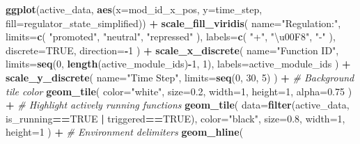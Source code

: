 \documentclass[
]{book}
\newenvironment{Shaded}{\begin{snugshade}}{\end{snugshade}}
\newcommand{\CommentTok}[1]{\textcolor[rgb]{0.56,0.35,0.01}{\textit{#1}}}
\newcommand{\DataTypeTok}[1]{\textcolor[rgb]{0.13,0.29,0.53}{#1}}
\newcommand{\DecValTok}[1]{\textcolor[rgb]{0.00,0.00,0.81}{#1}}
\newcommand{\FloatTok}[1]{\textcolor[rgb]{0.00,0.00,0.81}{#1}}
\newcommand{\KeywordTok}[1]{\textcolor[rgb]{0.13,0.29,0.53}{\textbf{#1}}}
\newcommand{\NormalTok}[1]{#1}
\newcommand{\OperatorTok}[1]{\textcolor[rgb]{0.81,0.36,0.00}{\textbf{#1}}}
\newcommand{\OtherTok}[1]{\textcolor[rgb]{0.56,0.35,0.01}{#1}}
\newcommand{\StringTok}[1]{\textcolor[rgb]{0.31,0.60,0.02}{#1}}
\begin{document}
\begin{Shaded}
\begin{Highlighting}[]
\KeywordTok{ggplot}\NormalTok{(active\_data, }\KeywordTok{aes}\NormalTok{(}\DataTypeTok{x=}\NormalTok{mod\_id\_x\_pos, }\DataTypeTok{y=}\NormalTok{time\_step, }\DataTypeTok{fill=}\NormalTok{regulator\_state\_simplified)) }\OperatorTok{+}
\StringTok{  }\KeywordTok{scale\_fill\_viridis}\NormalTok{(}
    \DataTypeTok{name=}\StringTok{"Regulation:"}\NormalTok{,}
    \DataTypeTok{limits=}\KeywordTok{c}\NormalTok{(}
      \StringTok{"promoted"}\NormalTok{,}
      \StringTok{"neutral"}\NormalTok{,}
      \StringTok{"repressed"}
\NormalTok{    ),}
    \DataTypeTok{labels=}\KeywordTok{c}\NormalTok{(}
      \StringTok{"+"}\NormalTok{,}
      \StringTok{"\textbackslash{}u00F8"}\NormalTok{,}
      \StringTok{"{-}"}
\NormalTok{    ),}
    \DataTypeTok{discrete=}\OtherTok{TRUE}\NormalTok{,}
    \DataTypeTok{direction=}\OperatorTok{{-}}\DecValTok{1}
\NormalTok{  ) }\OperatorTok{+}
\StringTok{  }\KeywordTok{scale\_x\_discrete}\NormalTok{(}
    \DataTypeTok{name=}\StringTok{"Function ID"}\NormalTok{,}
    \DataTypeTok{limits=}\KeywordTok{seq}\NormalTok{(}\DecValTok{0}\NormalTok{, }\KeywordTok{length}\NormalTok{(active\_module\_ids)}\OperatorTok{{-}}\DecValTok{1}\NormalTok{, }\DecValTok{1}\NormalTok{),}
    \DataTypeTok{labels=}\NormalTok{active\_module\_ids}
\NormalTok{  ) }\OperatorTok{+}
\StringTok{  }\KeywordTok{scale\_y\_discrete}\NormalTok{(}
    \DataTypeTok{name=}\StringTok{"Time Step"}\NormalTok{,}
    \DataTypeTok{limits=}\KeywordTok{seq}\NormalTok{(}\DecValTok{0}\NormalTok{, }\DecValTok{30}\NormalTok{, }\DecValTok{5}\NormalTok{)}
\NormalTok{  ) }\OperatorTok{+}
\StringTok{  }\CommentTok{\# Background tile color}
\StringTok{  }\KeywordTok{geom\_tile}\NormalTok{(}
    \DataTypeTok{color=}\StringTok{"white"}\NormalTok{,}
    \DataTypeTok{size=}\FloatTok{0.2}\NormalTok{,}
    \DataTypeTok{width=}\DecValTok{1}\NormalTok{,}
    \DataTypeTok{height=}\DecValTok{1}\NormalTok{,}
    \DataTypeTok{alpha=}\FloatTok{0.75}
\NormalTok{  ) }\OperatorTok{+}
\StringTok{  }\CommentTok{\# Highlight actively running functions}
\StringTok{  }\KeywordTok{geom\_tile}\NormalTok{(}
    \DataTypeTok{data=}\KeywordTok{filter}\NormalTok{(active\_data, is\_running}\OperatorTok{==}\OtherTok{TRUE} \OperatorTok{|}\StringTok{ }\NormalTok{triggered}\OperatorTok{==}\OtherTok{TRUE}\NormalTok{),}
    \DataTypeTok{color=}\StringTok{"black"}\NormalTok{,}
    \DataTypeTok{size=}\FloatTok{0.8}\NormalTok{,}
    \DataTypeTok{width=}\DecValTok{1}\NormalTok{,}
    \DataTypeTok{height=}\DecValTok{1}
\NormalTok{  ) }\OperatorTok{+}
\StringTok{  }\CommentTok{\# Environment delimiters}
\StringTok{  }\KeywordTok{geom\_hline}\NormalTok{(}

\end{Highlighting}
\end{Shaded}
\end{document}

